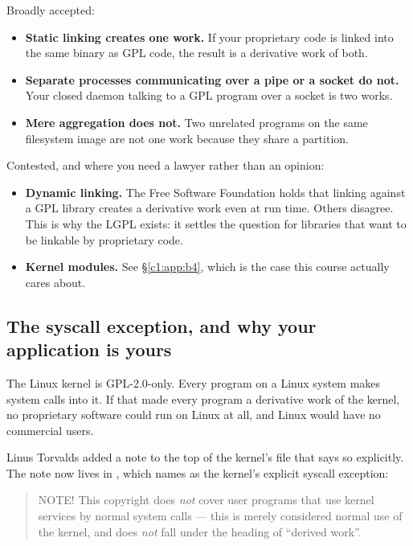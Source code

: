 Broadly accepted:
\begin{itemize}
  \item \textbf{Static linking creates one work.} If your proprietary code is linked into the same
    binary as GPL code, the result is a derivative work of both.
  \item \textbf{Separate processes communicating over a pipe or a socket do not.} Your closed daemon
    talking to a GPL program over a socket is two works.
  \item \textbf{Mere aggregation does not.} Two unrelated programs on the same filesystem image are
    not one work because they share a partition.
\end{itemize}
Contested, and where you need a lawyer rather than an opinion:
\begin{itemize}
  \item \textbf{Dynamic linking.} The Free Software Foundation holds that linking against a GPL
    library creates a derivative work even at run time. Others disagree. This is why the LGPL
    exists: it settles the question for libraries that want to be linkable by proprietary code.
  \item \textbf{Kernel modules.} See \S\ref{c1:app:b4}, which is the case this course actually cares
    about.
\end{itemize}

\subsection{The syscall exception, and why your application is yours}
\label{c1:app:b3}

The Linux kernel is GPL-2.0-only. Every program on a Linux system makes system calls into it. If
that made every program a derivative work of the kernel, no proprietary software could run on Linux
at all, and Linux would have no commercial users.

Linus Torvalds added a note to the top of the kernel's  file that says so explicitly.
The note now lives in , which  names as
the kernel's explicit syscall exception:

\begin{quote}
NOTE! This copyright does \emph{not} cover user programs that use kernel services by normal system
calls --- this is merely considered normal use of the kernel, and does \emph{not} fall under the
heading of ``derived work''.
\end{quote}

